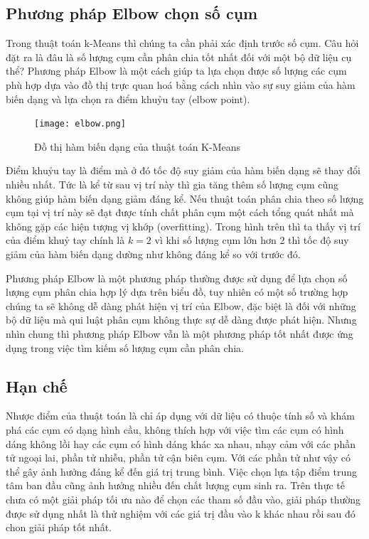 \documentclass{article}
\begin{document}
    \subsection{Phương pháp Elbow chọn số cụm}
    Trong thuật toán k-Means thì chúng ta cần phải xác định trước số cụm. Câu hỏi đặt ra là đâu là số lượng cụm cần phân chia tốt nhất đối với một bộ dữ liệu cụ thể? Phương pháp Elbow là một cách giúp ta lựa chọn được số lượng các cụm phù hợp dựa vào đồ thị trực quan hoá bằng cách nhìn vào sự suy giảm của hàm biến dạng và lựa chọn ra điểm khuỷu tay (elbow point).

    \begin{figure}[H]
        \centering            
        \texttt{[image: elbow.png]} \\
        \caption{Đồ thị hàm biến dạng của thuật toán K-Means}
        \label{fig:elbow}
    \end{figure}

    Điểm khuỷu tay là điểm mà ở đó tốc độ suy giảm của hàm biến dạng sẽ thay đổi nhiều nhất. Tức là kể từ sau vị trí này thì gia tăng thêm số lượng cụm cũng không giúp hàm biến dạng giảm đáng kể. Nếu thuật toán phân chia theo số lượng cụm tại vị trí này sẽ đạt được tính chất phân cụm một cách tổng quát nhất mà không gặp các hiện tượng vị khớp (overfitting). Trong hình trên thì ta thấy vị trí của điểm khuỷ tay chính là $k=2$ vì khi số lượng cụm lớn hơn 2 thì tốc độ suy giảm của hàm biến dạng dường như không đáng kể so với trước đó.

    Phương pháp Elbow là một phương pháp thường được sử dụng để lựa chọn số lượng cụm phân chia hợp lý dựa trên biểu đồ, tuy nhiên có một số trường hợp chúng ta sẽ không dễ dàng phát hiện vị trí của Elbow, đặc biệt là đối với những bộ dữ liệu mà qui luật phân cụm không thực sự dễ dàng được phát hiện. Nhưng nhìn chung thì phương pháp Elbow vẫn là một phương pháp tốt nhất được ứng dụng trong việc tìm kiếm số lượng cụm cần phân chia.

    \subsection{Hạn chế}
    Nhược điểm của thuật toán là chỉ áp dụng với dữ liệu có thuộc tính số và khám phá các cụm có dạng hình cầu, không thích hợp với việc tìm các cụm có hình dáng không lồi hay các cụm có hình dáng khác xa nhau, nhạy cảm với các phần tử ngoại lai, phần tử nhiễu, phần tử cận biên cụm. Với các phần tử như vậy có thể gây ảnh hưởng đáng kể đến giá trị trung bình. Việc chọn lựa tập điểm trung tâm ban đầu cũng ảnh hưởng nhiều đến chất lượng cụm sinh ra. Trên thực tế chưa có một giải pháp tối ưu nào để chọn các tham số đầu vào, giải pháp thường được sử dụng nhất là thử nghiệm với các giá trị đầu vào k khác nhau rồi sau đó chon giải pháp tốt nhất.
\end{document}
